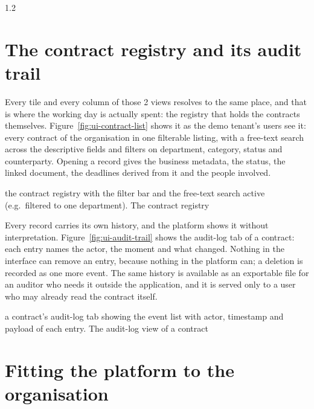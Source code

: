 \begin{spacing}{1.2}
\section{The contract registry and its audit trail}
\label{sec:walk-registry}

Every tile and every column of those 2 views resolves to the same
place, and that is where the working day is actually spent: the
registry that holds the contracts themselves.
Figure~\ref{fig:ui-contract-list} shows it as the demo tenant's users
see it: every contract of the organisation in one filterable listing,
with a free-text search across the descriptive fields and filters on
department, category, status and counterparty. Opening a record gives
the business metadata, the status, the linked document, the deadlines
derived from it and the people involved.

  {the contract registry with the filter bar and the free-text search
   active (e.g.\ filtered to one department).}
  {The contract registry}

Every record carries its own history, and the platform shows it without
interpretation. Figure~\ref{fig:ui-audit-trail} shows the audit-log tab
of a contract: each entry names the actor, the moment and what changed.
Nothing in the interface can remove an entry, because nothing in the
platform can; a deletion is recorded as one more event. The same
history is available as an
exportable file for an auditor who needs it outside the application, and
it is served only to a user who may already read the contract itself.

  {a contract's audit-log tab showing the event list with actor,
   timestamp and payload of each entry.}
  {The audit-log view of a contract}

\section{Fitting the platform to the organisation}
\label{sec:walk-config}


\end{spacing}
